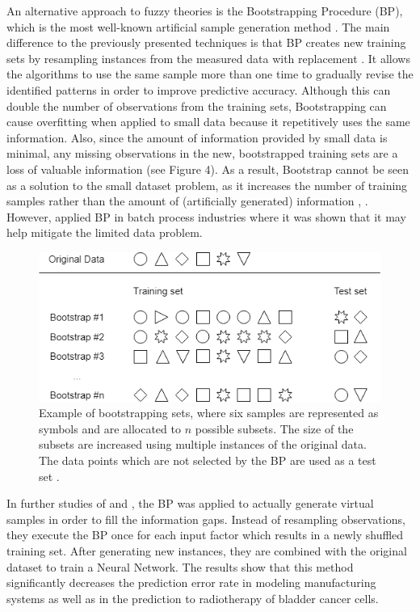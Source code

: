 \documentclass[parskip=full]{scrartcl}
\begin{document}
An alternative approach to fuzzy theories is the Bootstrapping Procedure (BP),
which is the most well-known artificial sample generation method
\cite{AbdulLateh.2017}. The main difference to the previously presented
techniques is that BP creates new training sets by resampling instances from the
measured data with replacement \cite{Efron.1993}. It allows the algorithms to
use the same sample more than one time to gradually revise the identified
patterns in order to improve predictive accuracy. Although this can double the
number of observations from the training sets, Bootstrapping can cause
overfitting when applied to small data because it repetitively uses the same
information. Also, since the amount of information provided by small data is
minimal, any missing observations in the new, bootstrapped training sets are a
loss of valuable information (see Figure 4). As a result, Bootstrap cannot be
seen as a solution to the small dataset problem, as it increases the number of
training samples rather than the amount of (artificially generated) information
\cite{Tsai.2015}, \cite{Li.2018}. However, \cite{Ivanescu.2006} applied BP in
batch process industries where it was shown that it may help mitigate the
limited data problem.

\begin{figure}[H]
	\centering
	\includegraphics[width=0.6\linewidth]{./resources/bootstrapping_example}
	\caption{Example of bootstrapping sets, where six samples are represented 
	as symbols and are allocated to $\mathit{n}$ possible subsets. The size of 
	the subsets are increased using multiple instances of the original data. 
	The data points which are not selected by the BP are used as a test set 
	\cite{Kuhn.2013}.}
	\label{fig:bootstrappingexample}
\end{figure}

In further studies of \cite{Tsai.2008} and \cite{Chao.2011}, the BP was applied
to actually generate virtual samples in order to fill the information gaps.
Instead of resampling observations, they execute the BP once for each input
factor which results in a newly shuffled training set. After generating new
instances, they are combined with the original dataset to train a Neural
Network. The results show that this method significantly decreases the
prediction error rate in modeling manufacturing systems as well as in the
prediction to radiotherapy of bladder cancer cells.
\end{document}
